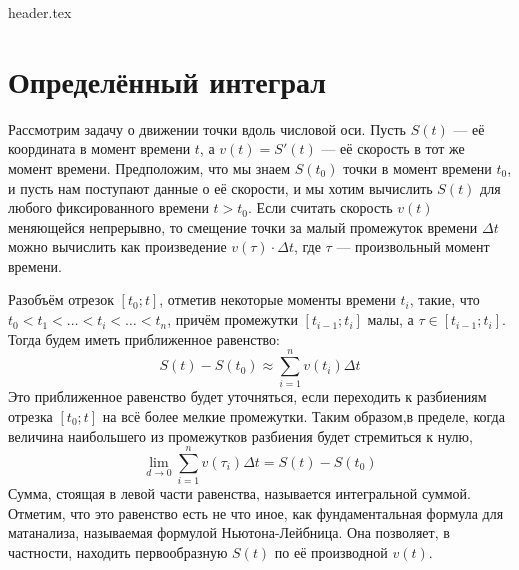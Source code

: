  {header.tex}

	\section{Определённый интеграл}
	Рассмотрим задачу о движении точки вдоль числовой оси.
	Пусть $S(t)$ --- её координата в момент времени $t$, а
	$v(t) = S'(t)$ --- её скорость в тот же момент времени.
	Предположим, что мы знаем $S(t_0)$ точки в момент времени $t_0$, и пусть нам
	поступают данные о её скорости, и мы хотим вычислить $S(t)$ для любого
	фиксированного времени $t>t_0$.
	Если считать скорость $v(t)$ меняющейся непрерывно, то смещение точки за
	малый промежуток времени $\Delta t$ можно вычислить как произведение
	$v(\tau)\cdot\Delta t$, где $\tau$ --- произвольный момент времени.
	
	Разобъём отрезок $[t_0;t]$, отметив некоторые моменты времени $t_i$, такие,
	что	$t_0<t_1<\ldots<t_i<\ldots<t_n$, причём промежутки $[t_{i-1};t_i]$ малы,
	а $\tau\in[t_{i-1};t_i]$. Тогда будем иметь приближенное равенство:
	\[
	S(t)-S(t_0)\approx\sum^{n}_{i=1}v(t_i)\Delta t
	\]
	Это приближенное равенство будет уточняться, если переходить к разбиениям
	отрезка $[t_0;t]$ на всё более мелкие промежутки.
	Таким образом,в пределе, когда величина наибольшего из промежутков разбиения
	будет стремиться к нулю, \[\lim\limits_{d\to 0}\sum_{i=1}^{n}v(\tau_i)\Delta t
	=S(t)-S(t_0)\]
	Сумма, стоящая в левой части равенства, называется интегральной суммой.
	Отметим, что это равенство есть не что иное, как фундаментальная формула для
	матанализа, называемая формулой Ньютона-Лейбница.
	Она позволяет, в частности, находить первообразную $S(t)$ по её производной
	$v(t)$.
